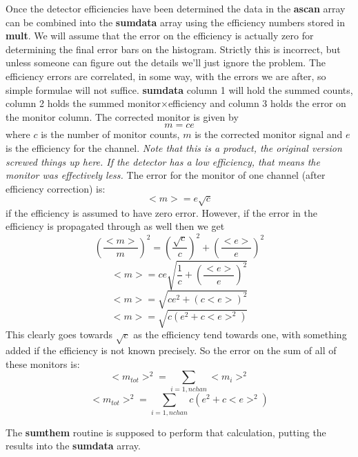 \documentclass[10pt,a4paper,notitlepage]{article}
\newcommand{\var}[1]{\textbf{\textsf{#1}}} %
\newcommand{\code}[1]{\textbf{\textsf{#1}}} %
\begin{document}
Once the detector efficiencies have been determined the data in the \var{ascan}
array can be combined into the \var{sumdata} array using the efficiency numbers
stored in \var{mult}.
We will assume that the error on the efficiency is actually zero for 
determining the final error bars on the histogram. 
Strictly this is incorrect, but unless someone can figure out the details
we'll just ignore the problem. 
The efficiency errors are correlated, in some way, with the errors we are
after, so simple formulae will not suffice.
\var{sumdata} column 1 will hold the summed counts, column 2 holds
the summed monitor$\times$efficiency and column 3 holds the error on the 
monitor column.
The corrected monitor is given by \[ m = {c}{e} \]
where $c$ is the number of monitor counts, $m$ is the corrected monitor
signal and $e$ is the efficiency for the channel.
\emph{Note that this is a product, the original version screwed things up
here. If the detector has a low efficiency, that means the monitor was
effectively less.}
The error for the monitor of one channel (after efficiency correction) is:
\[ <m> = e\sqrt{c} \]
if the efficiency is assumed to have zero error. 
However, if the error in the efficiency is propagated through as well
then we get
\[ \left(\frac{<m>}{m}\right)^{2} = \left( \frac{ \sqrt{c}} {c} \right)^{2}
 + \left( \frac{<e>}{e}\right)^{2} \]
\[ <m> = ce \sqrt{  \frac{1}{c} + \left( \frac{<e>}{e}\right)^2} \]
\[ <m> = \sqrt{  ce^{2} + \left( c<e> \right)^2} \]
\[ <m> = \sqrt{  c \left( e^{2} + c<e>^{2} \right)} \]
This clearly goes towards $\sqrt{c}$ as the efficiency tend towards one, 
with something added if the efficiency is not known precisely.
So the error on the sum of all of these monitors is:
\[ <m_{tot}>^{2} = \sum_{i=1,nchan} <m_{i}>^2 \]
\[ <m_{tot}>^{2} = \sum_{i=1,nchan}  c \left( e^{2} + c<e>^{2} \right) \]

The \code{sumthem} routine is supposed to perform that calculation, 
putting the results into the \var{sumdata} array.
\end{document}
